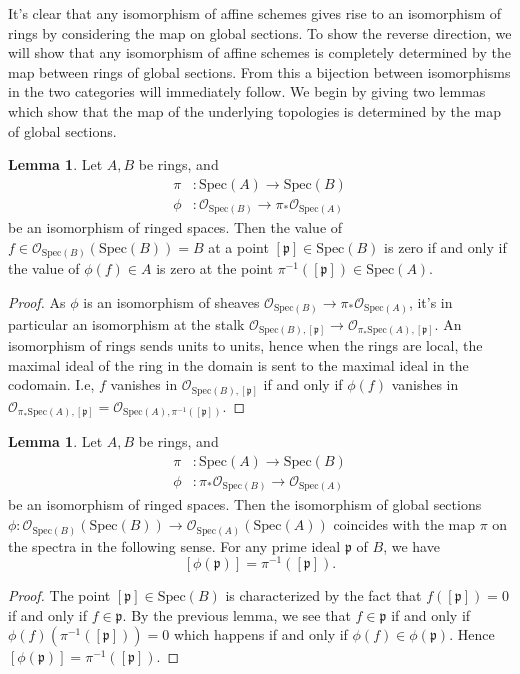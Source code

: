 \documentclass{article}
\theoremstyle{definition}
\newtheorem{lemma}[theorem]{Lemma}
\newcommand{\oo}{\mathcal{O}}
\newcommand{\osp}[1]{\oo_{\Spec\left(#1\right)}}
\newcommand{\Spec}{\text{Spec}}
\begin{document}
It's clear that any isomorphism of affine schemes gives rise to an isomorphism
of rings by considering the map on global sections. To show the reverse
direction, we will show that any isomorphism of affine schemes is completely
determined by the map between rings of global sections. From this a bijection
between isomorphisms in the two categories will immediately follow. We begin by
giving two lemmas which show that the map of the underlying topologies is
determined by the map of global sections.

\begin{lemma}
	Let $A, B$ be rings, and
	\begin{align*}
		\pi  & : \Spec(A) \to \Spec(B)    \\
		\phi & : \osp{B} \to \pi_*\osp{A}
	\end{align*}
	be an isomorphism of ringed spaces. Then the value of $f \in
		\osp{B}(\Spec(B)) = B$ at a point $[\mathfrak{p}] \in \Spec(B)$ is zero if
	and only if the value of $\phi(f) \in A$ is zero at the point
	$\pi^{-1}([\mathfrak{p}]) \in \Spec(A)$.
\end{lemma}
\begin{proof}
	As $\phi$ is an isomorphism of sheaves $\osp{B} \to \pi_*\osp{A}$, it's in
	particular an isomorphism at the stalk $\oo_{\Spec(B), [\mathfrak{p}]} \to
		\oo_{\pi_* \Spec(A), [\mathfrak{p}]}$. An isomorphism of rings sends units
	to units, hence when the rings are local, the maximal ideal of the ring in
	the domain is sent to the maximal ideal in the codomain. I.e, $f$ vanishes
	in $\oo_{\Spec(B), [\mathfrak{p}]}$ if and only if $\phi(f)$ vanishes in
	$\oo_{\pi_* \Spec(A), [\mathfrak{p}]} = \oo_{\Spec(A),
			\pi^{-1}([\mathfrak{p}])}$.
\end{proof}

\begin{lemma}
	Let $A, B$ be rings, and
	\begin{align*}
		\pi  & : \Spec(A) \to \Spec(B)    \\
		\phi & : \pi_*\osp{B} \to \osp{A}
	\end{align*}
	be an isomorphism of ringed spaces. Then the isomorphism of global sections
	$\phi : \osp{B}(\Spec(B)) \to \osp{A}(\Spec(A))$ coincides with the map
	$\pi$ on the spectra in the following sense. For any prime ideal
	$\mathfrak{p}$ of $B$, we have
	\[
		[\phi(\mathfrak{p})]
		=
		\pi^{-1}([\mathfrak{p}]).
	\]
\end{lemma}
\begin{proof}
	The point $[\mathfrak{p}] \in \Spec(B)$ is characterized by the fact that
	$f([\mathfrak{p}]) = 0$ if and only if $f \in \mathfrak{p}$. By the
	previous lemma, we see that $f \in \mathfrak{p}$ if and only if
	$\phi(f)(\pi^{-1}([\mathfrak{p}])) = 0$ which happens if and only if
	$\phi(f) \in \phi(\mathfrak{p})$. Hence $[\phi(\mathfrak{p})] =
		\pi^{-1}([\mathfrak{p}])$.
\end{proof}
\end{document}
